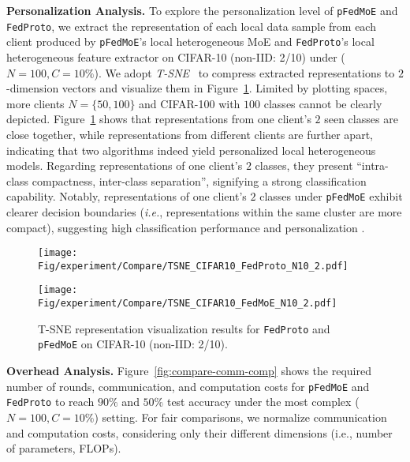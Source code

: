 \documentclass[sigconf]{acmart}
\newcommand{\hetero}{heterogeneous }
\newcommand{\pers}{personalized }
\newcommand{\persN}{personalization }
\newcommand{\rep}{representation }
\newcommand{\reps}{representations }
\newcommand{\methodname}{{\tt{pFedMoE}}}
\begin{document}
\textbf{Personalization Analysis.} To explore the \persN level of \methodname{} and {\tt{FedProto}}, we extract the \rep of each local data sample from each client produced by \methodname{}'s local \hetero MoE and {\tt{FedProto}}'s local \hetero feature extractor on CIFAR-10 (non-IID: 2/10) under ($N=100, C=10\%$). We adopt \textit{T-SNE}~\citep{TSNE-JMLR} to compress extracted \reps to $2$-dimension vectors and visualize them in Figure~\ref{fig:compare-TSNE}. Limited by plotting spaces, more clients $N=\{50, 100\}$ and CIFAR-100 with $100$ classes cannot be clearly depicted. Figure~\ref{fig:compare-TSNE} shows that \reps from one client's $2$ seen classes are close together, while \reps from different clients are further apart, indicating that two algorithms indeed yield \pers local \hetero models. Regarding \reps of one client's $2$ classes, they present ``intra-class compactness, inter-class separation'', signifying a strong classification capability. Notably, representations of one client's $2$ classes under \methodname{} exhibit clearer decision boundaries (\emph{i.e.}, \reps within the same cluster are more compact), suggesting high classification performance and \persN.


\begin{figure}[t]
\centering
\begin{minipage}[t]{0.5\linewidth}
\centering
\texttt{[image: Fig/experiment/Compare/TSNE\_CIFAR10\_FedProto\_N10\_2.pdf]}
\end{minipage}%
\begin{minipage}[t]{0.5\linewidth}
\centering
\texttt{[image: Fig/experiment/Compare/TSNE\_CIFAR10\_FedMoE\_N10\_2.pdf]}
\end{minipage}%
\vspace{-1em}
\caption{T-SNE representation visualization results for {\tt{FedProto}} and \methodname{} on CIFAR-10 (non-IID: 2/10).}
\label{fig:compare-TSNE}
\vspace{-1em}
\end{figure}

\textbf{Overhead Analysis.} Figure~\ref{fig:compare-comm-comp} shows the required number of rounds, communication, and computation costs for \methodname{} and {\tt{FedProto}} to reach $90\%$ and $50\%$ test accuracy under the most complex ($N=100, C=10\%$) setting.
For fair comparisons, we normalize communication and computation costs, considering only their different dimensions (i.e., number of parameters, FLOPs).
\end{document}
